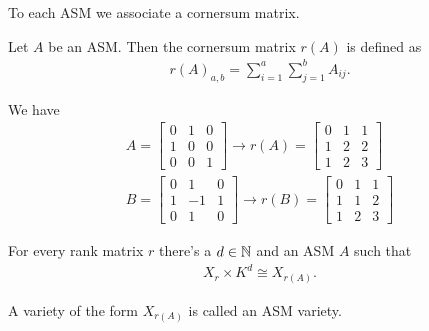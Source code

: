To each ASM we associate a cornersum matrix.

\begin{definition}
    Let $A$ be an ASM. Then the cornersum matrix $r(A)$ is defined as
    \begin{align*}
        r(A)_{a,b} = \sum_{i=1}^a \sum_{j=1}^b A_{ij}.
    \end{align*}
\end{definition}

\begin{example}
    We have
    \begin{align*}
        A =
        \begin{bmatrix}
            0 & 1 & 0 \\
            1 & 0 & 0 \\
            0 & 0 & 1
        \end{bmatrix}
        \longrightarrow
        r(A) = 
        \begin{bmatrix}
            0 & 1 & 1 \\
            1 & 2 & 2 \\
            1 & 2 & 3
        \end{bmatrix} \\
        B =
        \begin{bmatrix}
            0 & 1 & 0 \\
            1 & -1 & 1 \\
            0 & 1 & 0
        \end{bmatrix}
        \longrightarrow
        r(B) = 
        \begin{bmatrix}
            0 & 1 & 1 \\
            1 & 1 & 2 \\
            1 & 2 & 3
        \end{bmatrix}
    \end{align*}
\end{example}

\begin{theorem}
    For every rank matrix $r$ there's a $d \in \mathbb{N}$ and an ASM $A$ such that 
    \begin{align*}
        X_r \times K^d \cong X_{r(A)}.
    \end{align*}
\end{theorem}

\begin{definition}
    A variety of the form $X_{r(A)}$ is called an ASM variety.
\end{definition}

